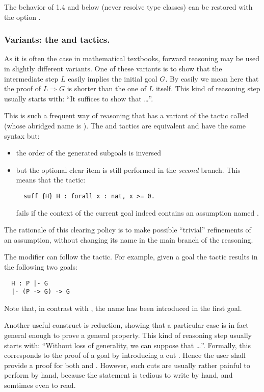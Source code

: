 The behavior of \ssr{} 1.4 and below (never resolve type classes)
can be restored with the option .

\subsubsection*{Variants: the  and   tactics.}
\label{ssec:wlog}

As it is often the case  in mathematical textbooks, forward
reasoning may be used in slightly different variants.
One of these variants is to show that the intermediate step $L$
easily implies the initial goal $G$. By easily we mean here that
the proof of $L \Rightarrow G$ is shorter than the one of $L$
itself. This kind of reasoning step usually starts with:
``It suffices to show that \dots''.

This is such a frequent way of reasoning that \ssr{} has a variant of the
 tactic called  (whose abridged name is
). The  and  tactics are equivalent and
have the same syntax but:
\begin{itemize}
\item the order of the generated subgoals is inversed
\item but the optional clear item is still performed in the
  \emph{second} branch. This means that the tactic:
\begin{lstlisting}
  suff {H} H : forall x : nat, x >= 0.
\end{lstlisting}
fails if the context of the current goal indeed contains an
assumption named .
\end{itemize}
The rationale of this clearing policy is to make possible ``trivial''
refinements of an assumption, without changing its name in the main
branch of the reasoning.

The  modifier can follow the  tactic.
For example, given a goal  the tactic
 results in the following two goals:
\begin{lstlisting}
  H : P |- G
  |- (P -> G) -> G
\end{lstlisting}
Note that, in contrast with , the name  has been introduced
in the first goal.

Another useful construct is reduction,
showing that a particular case is in fact general enough to prove
a general property. This kind of reasoning step usually starts with:
``Without loss of generality, we can suppose that \dots''.
Formally, this corresponds to the proof of a goal  by introducing
a cut  . Hence the user shall provide a
proof for both \ssrC{(}  and
 . However, such cuts are usually rather
painful to perform by hand, because the statement
 is tedious to write by hand, and somtimes even
to read.

